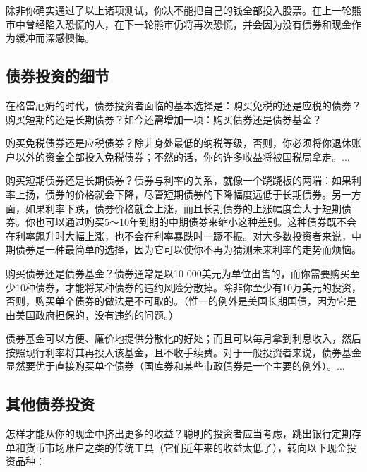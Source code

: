 \documentclass[12pt,oneside]{book}
\begin{document}
除非你确实通过了以上诸项测试，你决不能把自己的钱全部投入股票。在上一轮熊市中曾经陷入恐慌的人，在下一轮熊市仍将再次恐慌，并会因为没有债券和现金作为缓冲而深感懊悔。

\subsection{债券投资的细节}
在格雷厄姆的时代，债券投资者面临的基本选择是：购买免税的还是应税的债券？购买短期的还是长期债券？如今还需增加一项：购买债券还是债券基金？

购买免税债券还是应税债券？除非身处最低的纳税等级，否则，你必须将你退休账户以外的资金全部投入免税债券；不然的话，你的许多收益将被国税局拿走。...

购买短期债券还是长期债券？债券与利率的关系，就像一个跷跷板的两端：如果利率上扬，债券的价格就会下降，尽管短期债券的下降幅度远低于长期债券。另一方面，如果利率下跌，债券价格就会上涨，而且长期债券的上涨幅度会大于短期债券。你也可以通过购买5～10年到期的中期债券来缩小这种差别。这种债券既不会在利率飙升时大幅上涨，也不会在利率暴跌时一蹶不振。对大多数投资者来说，中期债券是一种最简单的选择，因为它可以使你不再为猜测未来利率的走势而烦恼。

购买债券还是债券基金？债券通常是以10 000美元为单位出售的，而你需要购买至少10种债券，才能将某种债券的违约风险分散掉。除非你至少有10万美元的投资，否则，购买单个债券的做法是不可取的。（惟一的例外是美国长期国债，因为它是由美国政府担保的，没有违约的问题。）

债券基金可以方便、廉价地提供分散化的好处；而且可以每月拿到利息收入，然后按照现行利率将其再投入该基金，且不收手续费。对于一般投资者来说，债券基金显然要优于直接购买单个债券（国库券和某些市政债券是一个主要的例外）。...


\subsection{其他债券投资}
怎样才能从你的现金中挤出更多的收益？聪明的投资者应当考虑，跳出银行定期存单和货币市场账户之类的传统工具（它们近年来的收益太低了），转向以下现金投资品种：
\end{document}
